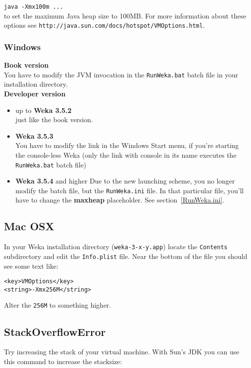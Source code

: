 \verb=java -Xmx100m ...=\\

\noindent to set the maximum Java heap size to 100MB. For more
information about these options see
\verb=http://java.sun.com/docs/hotspot/VMOptions.html=.

\subsubsection{Windows}

\textbf{Book version}\\
You have to modify the JVM invocation
in the \verb=RunWeka.bat= batch file in your installation directory.\\

\noindent \textbf{Developer version}
\begin{itemize}
\item up to \textbf{Weka 3.5.2}\\
just like the book version.
\item \textbf{Weka 3.5.3}\\
You have to modify the link in the Windows Start menu, if you're starting the console-less Weka (only the link with console in its name executes the \verb=RunWeka.bat= batch file)
\item \textbf{Weka 3.5.4} and higher
Due to the new launching scheme, you no longer modify the batch file, but the \verb=RunWeka.ini= file. In that particular file, you'll have to change the \textbf{maxheap} placeholder. See section~\ref{RunWeka.ini}.
\end{itemize}

\subsection{Mac OSX}
In your Weka installation directory (\verb=weka-3-x-y.app=) locate the \verb=Contents= subdirectory and edit the
\verb=Info.plist= file. Near the bottom of the file you should see some text like:

\begin{verbatim}
<key>VMOptions</key>
<string>-Xmx256M</string>
\end{verbatim}

\noindent Alter the \verb=256M= to something higher.

\subsection{StackOverflowError}
Try increasing the stack of your virtual machine. With Sun's JDK you
can use this command to increase the stacksize:\\

